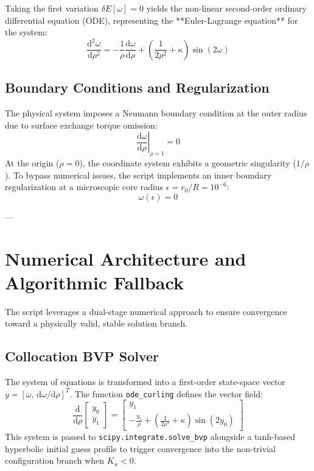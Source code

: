 \documentclass[11pt,a4paper]{article}
\newcommand{\dd}{\mathrm{d}}
\newcommand{\rhoadj}{\rho}
\newcommand{\kappaadim}{\kappa}
\newcommand{\epsilonadim}{\epsilon}
\begin{document}
Taking the first variation $\delta E[\omega] = 0$ yields the non-linear second-order ordinary differential equation (ODE), representing the **Euler-Lagrange equation** for the system:
\begin{equation}\label{eq:el_ode}
    \frac{\dd^2\omega}{\dd\rhoadj^2} = -\frac{1}{\rhoadj}\frac{\dd\omega}{\dd\rhoadj} + \left( \frac{1}{2\rhoadj^2} + \kappaadim \right)\sin(2\omega)
\end{equation}

\subsection{Boundary Conditions and Regularization}
The physical system imposes a Neumann boundary condition at the outer radius due to surface exchange torque omission:
\begin{equation}
    \left.\frac{\dd\omega}{\dd\rhoadj}\right|_{\rhoadj=1} = 0
\end{equation}
At the origin ($\rhoadj = 0$), the coordinate system exhibits a geometric singularity ($1/\rhoadj$). To bypass numerical issues, the script implements an inner boundary regularization at a microscopic core radius $\epsilonadim = r_0/R = 10^{-6}$:
\begin{equation}
    \omega(\epsilonadim) = 0
\end{equation}

---

\section{Numerical Architecture and Algorithmic Fallback}

The script leverages a dual-stage numerical approach to ensure convergence toward a physically valid, stable solution branch.

\subsection{Collocation BVP Solver}
The system of equations is transformed into a first-order state-space vector $y = [\omega, \, \dd\omega/\dd\rhoadj]^T$. The function \texttt{ode\_curling} defines the vector field:
\begin{equation}
    \frac{\dd}{\dd\rhoadj} \begin{bmatrix} y_0 \\ y_1 \end{bmatrix} = \begin{bmatrix} y_1 \\ -\frac{y_1}{\rhoadj} + \left(\frac{1}{2\rhoadj^2} + \kappaadim\right)\sin(2y_0) \end{bmatrix}
\end{equation}
This system is passed to \texttt{scipy.integrate.solve\_bvp} alongside a tanh-based hyperbolic initial guess profile to trigger convergence into the non-trivial configuration branch when $K_u < 0$.
\end{document}
